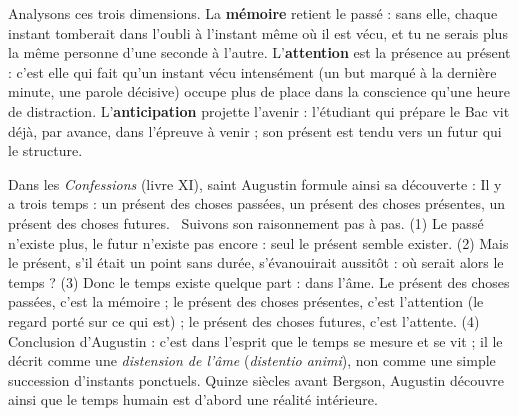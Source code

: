 \documentclass[11pt]{article}
\begin{document}
Analysons ces trois dimensions. La \textbf{mémoire} retient le passé : sans elle, chaque instant tomberait dans l'oubli à l'instant même où il est vécu, et tu ne serais plus la même personne d'une seconde à l'autre. L'\textbf{attention} est la présence au présent : c'est elle qui fait qu'un instant vécu intensément (un but marqué à la dernière minute, une parole décisive) occupe plus de place dans la conscience qu'une heure de distraction. L'\textbf{anticipation} projette l'avenir : l'étudiant qui prépare le Bac vit déjà, par avance, dans l'épreuve à venir ; son présent est tendu vers un futur qui le structure.

\begin{experience}
Dans les \emph{Confessions} (livre XI), saint Augustin formule ainsi sa découverte : \guillemotleft Il y a trois temps : un présent des choses passées, un présent des choses présentes, un présent des choses futures. \guillemotright\ Suivons son raisonnement pas à pas. (1) Le passé n'existe plus, le futur n'existe pas encore : seul le présent semble exister. (2) Mais le présent, s'il était un point sans durée, s'évanouirait aussitôt : où serait alors le temps ? (3) Donc le temps existe quelque part : dans l'âme. Le présent des choses passées, c'est la mémoire ; le présent des choses présentes, c'est l'attention (le regard porté sur ce qui est) ; le présent des choses futures, c'est l'attente. (4) Conclusion d'Augustin : c'est dans l'esprit que le temps se mesure et se vit ; il le décrit comme une \emph{distension de l'âme} (\emph{distentio animi}), non comme une simple succession d'instants ponctuels. Quinze siècles avant Bergson, Augustin découvre ainsi que le temps humain est d'abord une réalité intérieure.
\end{experience}
\end{document}
